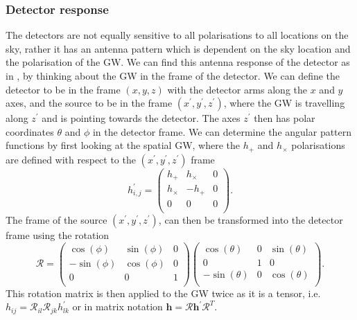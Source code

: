 \subsubsection{Detector response}

The detectors are not equally sensitive to all polarisations to all locations on the sky, rather it has an antenna pattern which is dependent on the sky location and the polarisation of the \gls{GW}. 
We can find this antenna response of the detector as in \citep{maggioreGravitationalWaves}, by thinking about the \gls{GW} in the frame of the detector.
We can define the detector to be in the frame $(x,y,z)$ with the detector arms along the $x$ and $y$ axes, and the source to be in the frame $(x^{\prime},y^{\prime},z^{\prime})$, where the \gls{GW} is travelling along $z^{'}$ and is pointing towards the detector. 
The axes $z^{\prime}$ then has polar coordinates $\theta$ and $\phi$ in the detector frame.
We can determine the angular pattern functions by first looking at the spatial \gls{GW}, where the $h_{+}$ and $h_{\times}$ polarisations are defined with respect to the $(x^{\prime},y^{\prime},z^{\prime})$ frame
\begin{equation}
    \label{intro:detector:response:gwwave}
    h^{\prime}_{i,j} = \left( 
    \begin{matrix} 
    h_{+} & h_{\times} & 0 \\
    h_{\times} & -h_{+} & 0 \\
    0 & 0 & 0  \\
    \end{matrix}
    \right).
\end{equation}
The frame of the source $(x^{\prime},y^{\prime},z^{\prime})$, can then be transformed into the detector frame using the rotation
\begin{equation}
    \label{intro:detector:response:rotation}
    \mathcal{R} = \left( 
    \begin{matrix} 
    \cos(\phi) & \sin(\phi) & 0 \\
    -\sin(\phi) & \cos(\phi) & 0 \\
    0 & 0 & 1  \\
    \end{matrix}
    \right)
    \left( 
    \begin{matrix} 
    \cos(\theta) & 0 & \sin(\theta) \\
    0 & 1 & 0 \\
    -\sin(\theta) & 0 & \cos(\theta)  \\
    \end{matrix}
    \right).
\end{equation}
This rotation matrix is then applied to the \gls{GW} twice as it is a tensor, i.e. $h_{ij} = \mathcal{R}_{il} \mathcal{R}_{jk} h^{\prime}_{lk} $ or in matrix notation $\bm{h} = \bm{\mathcal{R}} \bm{h}^{\prime} \bm{\mathcal{R}}^{T}$.

